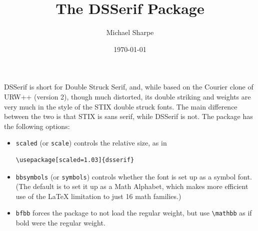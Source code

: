 \documentclass[11pt]{article}
\title{The DSSerif Package}
\author{Michael Sharpe}
\date{\today}  %
\begin{document}
\maketitle
DSSerif is short for Double Struck Serif, and, while based on the Courier  clone of URW++ (version 2), though much distorted, its double striking and weights are very much in the style of the STIX double struck fonts. The main difference between the two is that STIX is sans serif, while DSSerif is not. The  package has the following options:  
\begin{itemize}
\item
{\tt scaled} (or {\tt scale}) controls the relative size, as in
\begin{verbatim}
\usepackage[scaled=1.03]{dsserif}
\end{verbatim}
\item
{\tt bbsymbols} (or {\tt symbols}) controls whether the  font is set up as a symbol font. (The default is to set it up as a Math Alphabet, which makes more efficient use of the LaTeX limitation to just 16 math families.)
\item {\tt bfbb} forces the package to not load the regular weight, but use \verb|\mathbb| as if bold were the regular weight. 
\end{itemize}
\end{document}
